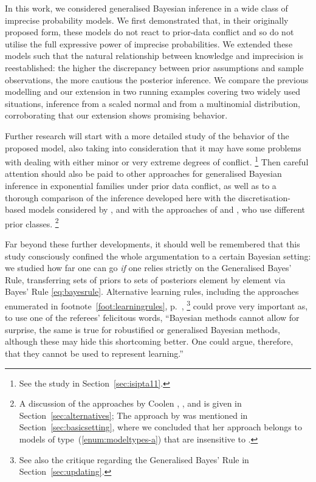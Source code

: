 In this work, we considered generalised Bayesian inference
in a wide class of imprecise probability models. We first
demonstrated that, in their originally proposed form, these models
do not react to prior-data conflict and so do not utilise
the full expressive power of imprecise probabilities. We
extended these models such that the natural relationship between
knowledge and imprecision is reestablished: the higher the
discrepancy between prior assumptions and sample observations, the
more cautious the posterior inference. We compare the previous
modelling and our extension in two running examples covering two
widely used situations, inference from a scaled normal and
from a multinomial distribution, corroborating that our extension
shows promising behavior.

Further research will start with a more detailed study of the behavior of the proposed model,
also taking into consideration that it may have some problems
with dealing with either minor or very extreme degrees of conflict.%
\footnote{See the study in Section~\ref{sec:isipta11}.}
Then careful attention should also be paid to
other approaches for generalised Bayesian inference in exponential
families \parencite{1993:coolen, 1997:boratynska} under prior data
conflict, as well as to a thorough comparison of the inference
developed here with the discretisation-based models considered by
\textcite{2005:whitcomb}, and with the approaches of \textcite{1991:pericchi}
and \textcite{1994:coolen}, who use different prior classes.%
\footnote{A discussion of the approaches by Coolen \parencite*{1993:coolen,1994:coolen},
\textcite{2005:whitcomb}, and \textcite{1991:pericchi} is given in Section~\ref{sec:alternatives};
The approach by \textcite{1997:boratynska} was mentioned in
Section~\ref{sec:basicsetting}, where we concluded that her approach
belongs to models of type~(\ref{enum:modeltypes-a}) that are insensitive to \pdc.}

Far beyond these further developments, it should well be
remembered that this study consciously confined the whole
argumentation to a certain Bayesian setting: we studied how far
one can go \emph{if} one relies strictly on the Generalised Bayes'
Rule, transferring sets of priors to sets of posteriors element by
element via Bayes' Rule \eqref{eq:bayesrule}. Alternative learning
rules, including the approaches enumerated in footnote~\ref{foot:learningrules}, p.~\pageref{foot:learningrules},%
\footnote{See also the critique regarding the Generalised Bayes' Rule in Section~\ref{sec:updating}.}
could prove very important as, to use one of the referees'
felicitous words, ``Bayesian methods cannot allow for surprise, the same is
true for robustified or generalised Bayesian methods, although these
may hide this shortcoming better. One could argue, therefore, that
they cannot be used to represent learning.''







